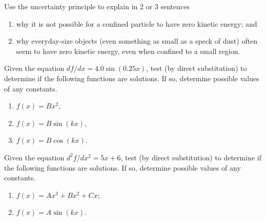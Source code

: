
\begin{problem}
Use the uncertainty principle to explain in 2 or 3 sentences 
\begin{enumerate}
\item why it is not possible for a confined particle to have zero
kinetic energy; and
\item why everyday-size objects (even something as small as a speck
of dust) often seem to have zero kinetic energy, even when confined
to a small region.
\end{enumerate}
\end{problem}


\begin{problem}
Given the equation $df/dx = 4.0\sin(0.25x)$, test (by direct substitution)
to determine if the following functions are solutions.  If so, determine
possible values of any constants.  
\begin{enumerate}
\item $f(x) = Bx^2$,
\item $f(x) = B\sin(kx)$,
\item $f(x) = B\cos(kx)$.
\end{enumerate}
\end{problem}


\begin{problem}
Given the equation $d^2f/dx^2 = 5x + 6$, test (by direct substitution)
to determine if the following functions are solutions.  If so, determine
possible values of any constants.  
\begin{enumerate}
\item $f(x) = Ax^3+Bx^2+Cx$;
\item $f(x) = A\sin(kx)$.
\end{enumerate}
\label{prob:SubstitutionPractice}
\end{problem}

\newpage


